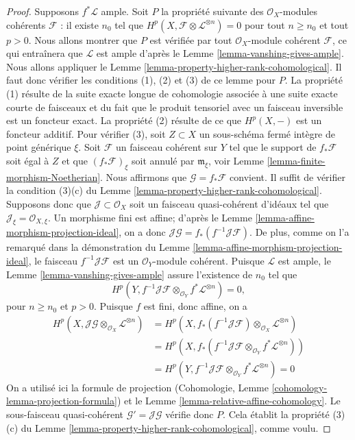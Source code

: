 \begin{proof}
\medskip\noindent
Supposons $f^*\mathcal{L}$ ample. Soit $P$ la propriété suivante des
$\mathcal{O}_X$-modules cohérents $\mathcal{F}$ : il existe $n_0$
tel que $H^p(X, \mathcal{F} \otimes \mathcal{L}^{\otimes n}) = 0$
pour tout $n \geq n_0$ et tout $p > 0$. Nous allons montrer que $P$ est vérifiée
par tout $\mathcal{O}_X$-module cohérent $\mathcal{F}$, ce qui entraînera que
$\mathcal{L}$ est ample d'après le Lemme \ref{lemma-vanshing-gives-ample}.
Nous allons appliquer le Lemme \ref{lemma-property-higher-rank-cohomological}.
Il faut donc vérifier les conditions (1), (2) et (3) de ce lemme pour $P$.
La propriété (1) résulte de la suite exacte longue de cohomologie associée
à une suite exacte courte de faisceaux et du fait que le produit tensoriel
avec un faisceau inversible est un foncteur exact. La propriété (2) résulte de ce que
$H^p(X, -)$ est un foncteur additif. Pour vérifier (3), soit $Z \subset X$
un sous-schéma fermé intègre de point générique $\xi$.
Soit $\mathcal{F}$ un faisceau cohérent sur $Y$ tel que
le support de $f_*\mathcal{F}$ soit égal à $Z$
et que $(f_*\mathcal{F})_\xi$ soit annulé par $\mathfrak m_\xi$,
voir Lemme \ref{lemma-finite-morphism-Noetherian}. Nous affirmons que
$\mathcal{G} = f_*\mathcal{F}$ convient. Il suffit de vérifier
la condition (3)(c) du Lemme \ref{lemma-property-higher-rank-cohomological}.
Supposons donc que $\mathcal{J} \subset \mathcal{O}_X$ soit un
faisceau quasi-cohérent d'idéaux tel que
$\mathcal{J}_\xi = \mathcal{O}_{X, \xi}$.
Un morphisme fini est affine; d'après le
Lemme \ref{lemma-affine-morphism-projection-ideal}, on a donc
$\mathcal{J}\mathcal{G} = f_*(f^{-1}\mathcal{J}\mathcal{F})$.
De plus, comme on l'a remarqué dans la démonstration du
Lemme \ref{lemma-affine-morphism-projection-ideal}, le faisceau
$f^{-1}\mathcal{J}\mathcal{F}$ est un $\mathcal{O}_Y$-module cohérent.
Puisque $\mathcal{L}$ est ample, le Lemme \ref{lemma-vanshing-gives-ample}
assure l'existence de $n_0$ tel que
$$
H^p(Y, f^{-1}\mathcal{J}\mathcal{F}
\otimes_{\mathcal{O}_Y} f^*\mathcal{L}^{\otimes n}) = 0,
$$
pour $n \geq n_0$ et $p > 0$. Puisque $f$ est fini, donc affine, on a
\begin{align*}
H^p(X, \mathcal{J}\mathcal{G} \otimes_{\mathcal{O}_X}
\mathcal{L}^{\otimes n})
& =
H^p(X, f_*(f^{-1}\mathcal{J}\mathcal{F}) \otimes_{\mathcal{O}_X}
\mathcal{L}^{\otimes n}) \\
& =
H^p(X, f_*(f^{-1}\mathcal{J}\mathcal{F} \otimes_{\mathcal{O}_Y}
f^*\mathcal{L}^{\otimes n})) \\
& =
H^p(Y, f^{-1}\mathcal{J}\mathcal{F} \otimes_{\mathcal{O}_Y}
f^*\mathcal{L}^{\otimes n}) = 0
\end{align*}
On a utilisé ici la formule de projection
(Cohomologie, Lemme \ref{cohomology-lemma-projection-formula}) et le
Lemme \ref{lemma-relative-affine-cohomology}.
Le sous-faisceau quasi-cohérent $\mathcal{G}' = \mathcal{J}\mathcal{G}$
vérifie donc $P$. Cela établit la propriété (3)(c) du
Lemme \ref{lemma-property-higher-rank-cohomological}, comme voulu.
\end{proof}

